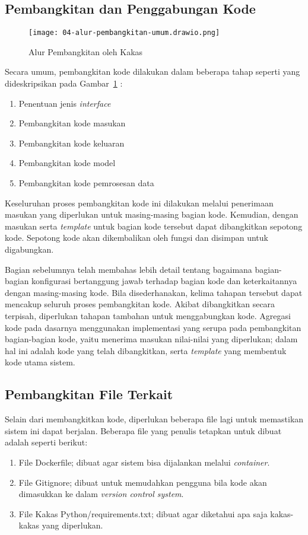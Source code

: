 \subsection{Pembangkitan dan Penggabungan Kode}

\begin{figure}[ht]
    \centering
    \texttt{[image: 04-alur-pembangkitan-umum.drawio.png]}
    \caption{Alur Pembangkitan oleh Kakas}\label{fig:04-flowchart-code-generation}
\end{figure}

Secara umum, pembangkitan kode dilakukan dalam beberapa tahap seperti yang dideskripsikan pada Gambar~\ref{fig:04-flowchart-code-generation} :
\begin{enumerate}
    \item Penentuan jenis \textit{interface}
    \item Pembangkitan kode masukan
    \item Pembangkitan kode keluaran
    \item Pembangkitan kode model
    \item Pembangkitan kode pemrosesan data
\end{enumerate}

Keseluruhan proses pembangkitan kode ini dilakukan melalui penerimaan masukan yang diperlukan untuk masing-masing bagian kode.
Kemudian, dengan masukan serta \textit{template} untuk bagian kode tersebut dapat dibangkitkan sepotong kode.
Sepotong kode akan dikembalikan oleh fungsi dan disimpan untuk digabungkan. 

Bagian sebelumnya telah membahas lebih detail tentang bagaimana bagian-bagian konfigurasi bertanggung jawab terhadap bagian kode dan keterkaitannya dengan masing-masing kode.
Bila disederhanakan, kelima tahapan tersebut dapat mencakup seluruh proses pembangkitan kode.
Akibat dibangkitkan secara terpisah, diperlukan tahapan tambahan untuk menggabungkan kode.
Agregasi kode pada dasarnya menggunakan implementasi yang serupa pada pembangkitan bagian-bagian kode, yaitu menerima masukan nilai-nilai yang diperlukan; dalam hal ini adalah kode yang telah dibangkitkan, serta \textit{template} yang membentuk kode utama sistem.

\subsection{Pembangkitan File Terkait}

Selain dari membangkitkan kode, diperlukan beberapa file lagi untuk memastikan sistem ini dapat berjalan.
Beberapa file yang penulis tetapkan untuk dibuat adalah seperti berikut:
\begin{enumerate}
    \item File Dockerfile; dibuat agar sistem bisa dijalankan melalui \textit{container}.
    \item File Gitignore; dibuat untuk memudahkan pengguna bila kode akan dimasukkan ke dalam \textit{version control system}.
    \item File Kakas Python/requirements.txt; dibuat agar diketahui apa saja kakas-kakas yang diperlukan.
\end{enumerate}

